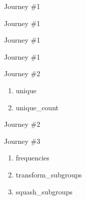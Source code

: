 \documentclass[10pt]{beamer}
\begin{document}
\begin{frame}{Journey \#1}
    \begin{block}{}
		
	\end{block}
\end{frame}
\begin{frame}{Journey \#1}
    \begin{block}{}
		
	\end{block}
\end{frame}

\begin{frame}{Journey \#1}
    \begin{block}{}
		
	\end{block}
\end{frame}

\begin{frame}{Journey \#1}
    \begin{block}{}
		
	\end{block}
\end{frame}

\begin{frame}{Journey \#2}
    \begin{enumerate}
        \item unique
        \item unique\_count
    \end{enumerate}
\end{frame}

\begin{frame}{Journey \#2}
    \begin{block}{}
		
	\end{block}
\end{frame}



\begin{frame}{Journey \#3}
    \begin{enumerate}
        \item frequencies 
        \item transform\_subgroups
        \item squash\_subgroups
    \end{enumerate}
\end{frame}
\end{document}
